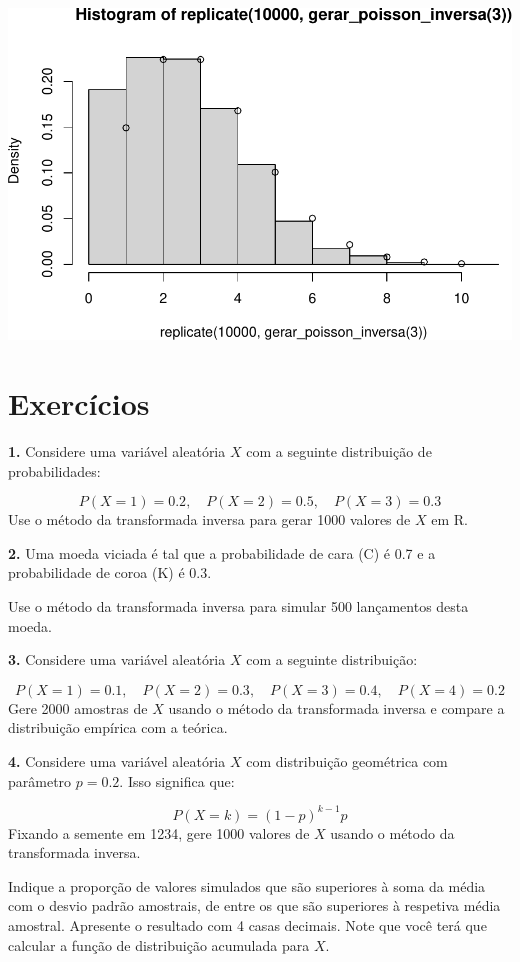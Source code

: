 \documentclass[
]{book}
\begin{document}
\includegraphics{introR_files/figure-latex/unnamed-chunk-290-1.pdf}

\section{Exercícios}\label{exercuxedcios-29}

\textbf{1.} Considere uma variável aleatória \(X\) com a seguinte distribuição
de probabilidades:

\[P(X = 1) = 0.2, \quad P(X = 2) = 0.5, \quad P(X = 3) = 0.3\] Use o
método da transformada inversa para gerar 1000 valores de \(X\) em R.

\textbf{2.} Uma moeda viciada é tal que a probabilidade de cara (C) é 0.7 e a
probabilidade de coroa (K) é 0.3.

Use o método da transformada inversa para simular 500 lançamentos desta
moeda.

\textbf{3.} Considere uma variável aleatória \(X\) com a seguinte distribuição:

\[P(X = 1) = 0.1, \quad P(X = 2) = 0.3, \quad P(X = 3) = 0.4, \quad P(X = 4) = 0.2\]
Gere 2000 amostras de \(X\) usando o método da transformada inversa e
compare a distribuição empírica com a teórica.

\textbf{4.} Considere uma variável aleatória \(X\) com distribuição geométrica
com parâmetro \(p = 0.2\). Isso significa que:

\[P(X = k) = (1 - p)^{k-1}p\]
Fixando a semente em 1234, gere 1000 valores de \(X\) usando o método da transformada inversa.

Indique a proporção de valores simulados que são superiores à soma da média com o desvio padrão amostrais, de entre os que são superiores à respetiva média amostral. Apresente o resultado com 4 casas decimais. Note que você terá que calcular a função de distribuição acumulada para \(X\).
\end{document}
